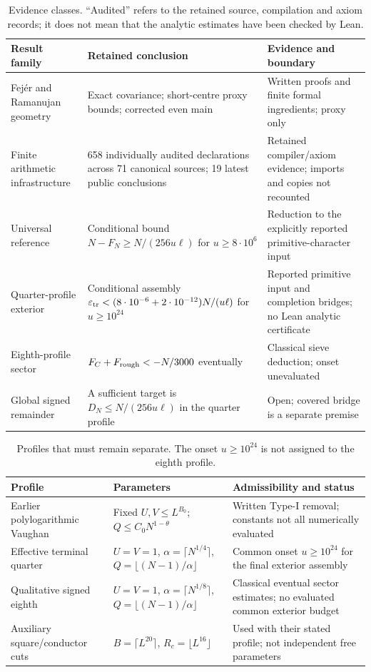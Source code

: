 \documentclass[11pt,a4paper]{article}
\theoremstyle{definition}
\theoremstyle{remark}
\begin{document}
\begin{table}[htbp]\centering\small
\begin{tabularx}{\textwidth}{@{}P{.24\textwidth}XP{.23\textwidth}@{}}\toprule
Result family & Retained conclusion & Evidence and boundary\\\midrule
Fej\'er and Ramanujan geometry & Exact covariance; short-centre proxy bounds; corrected even main & Written proofs and finite formal ingredients; proxy only\\
Finite arithmetic infrastructure & 658 individually audited declarations across 71 canonical sources; 19 latest public conclusions & Retained compiler/axiom evidence; imports and copies not recounted\\
Universal reference & Conditional bound $N-F_N\ge N/(256u\ell)$ for $u\ge8\cdot10^6$ & Reduction to the explicitly reported primitive-character input\\
Quarter-profile exterior & Conditional assembly $\varepsilon_{\rm tr}<(8\cdot10^{-6}+2\cdot10^{-12})N/(u\ell)$ for $u\ge10^{24}$ & Reported primitive input and completion bridges; no Lean analytic certificate\\
Eighth-profile sector & $F_C+F_{\rm rough}<-N/3000$ eventually & Classical sieve deduction; onset unevaluated\\
Global signed remainder & A sufficient target is $D_N\le N/(256u\ell)$ in the quarter profile & Open; covered bridge is a separate premise\\\bottomrule
\end{tabularx}
\caption{Evidence classes. ``Audited'' refers to the retained source, compilation and axiom records; it does not mean that the analytic estimates have been checked by Lean.}\label{tab:results}
\end{table}

\begin{table}[htbp]\centering\small
\begin{tabularx}{\textwidth}{@{}P{.24\textwidth}XP{.24\textwidth}@{}}\toprule
Profile & Parameters & Admissibility and status\\\midrule
Earlier polylogarithmic Vaughan & Fixed $U,V\le L^{B_0}$; $Q\le C_0N^{1-\theta}$ & Written Type-I removal; constants not all numerically evaluated\\
Effective terminal quarter & $U=V=1$, $\alpha=\lceil N^{1/4}\rceil$, $Q=\lfloor(N-1)/\alpha\rfloor$ & Common onset $u\ge10^{24}$ for the final exterior assembly\\
Qualitative signed eighth & $U=V=1$, $\alpha=\lceil N^{1/8}\rceil$, $Q=\lfloor(N-1)/\alpha\rfloor$ & Classical eventual sector estimates; no evaluated common exterior budget\\
Auxiliary square/conductor cuts & $B=\lceil L^{20}\rceil$, $R_c=\lfloor L^{16}\rfloor$ & Used with their stated profile; not independent free parameters\\\bottomrule
\end{tabularx}
\caption{Profiles that must remain separate. The onset $u\ge10^{24}$ is not assigned to the eighth profile.}\label{tab:profiles}
\end{table}
\end{document}

